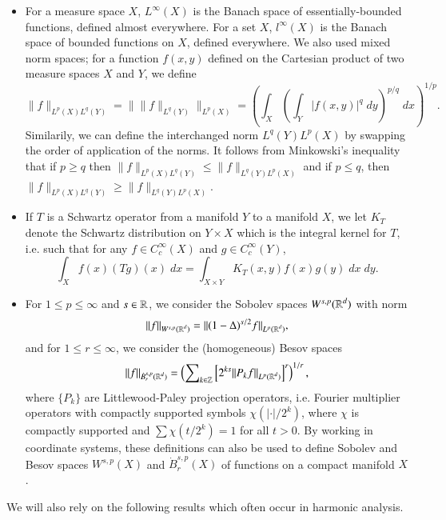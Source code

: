 \begin{itemize}
    \item For a measure space $X$, $L^\infty(X)$ is the Banach space of essentially-bounded functions, defined almost everywhere. For a set $X$, $l^\infty(X)$ is the Banach space of bounded functions on $X$, defined everywhere. We also used mixed norm spaces; for a function $f(x,y)$ defined on the Cartesian product of two measure spaces $X$ and $Y$, we define
    \[ \| f \|_{L^p(X) L^q(Y)} = \big\| \| f \|_{L^q(Y)} \big\|_{L^p(X)} = \left( \int\nolimits_X \left( \int\nolimits_Y |f(x,y)|^q\; dy \right)^{p/q}\; dx \right)^{1/p}. \]
    Similarily, we can define the interchanged norm $L^q(Y) L^p(X)$ by swapping the order of application of the norms. It follows from Minkowski's inequality that if $p \geq q$ then $\| f \|_{L^p(X) L^q(Y)} \leq \| f \|_{L^q(Y) L^p(X)}$ and if $p \leq q$, then $\| f \|_{L^p(X) L^q(Y)} \geq \| f \|_{L^q(Y) L^p(X)}$.

    \item If $T$ is a Schwartz operator from a manifold $Y$ to a manifold $X$, we let $K_T$ denote the Schwartz distribution on $Y \times X$ which is the integral kernel for $T$, i.e. such that for any $f \in C_c^\infty(X)$ and $g \in C_c^\infty(Y)$,
    \[ \int_X f(x) (Tg)(x)\; dx = \int_{X \times Y} K_T(x,y) f(x) g(y)\; dx\; dy. \]


    \item For $1 \leq p \leq \infty$ and $s \in \operatorname{\mathbb{R}}$, we consider the Sobolev spaces $W^{s,p}(\operatorname{\mathbb{R}}^d)$ with norm
    \[ \| f \|_{W^{s,p}(\operatorname{\mathbb{R}}^d)} = \| (1-\Delta)^{s/2} f \|_{L^p(\operatorname{\mathbb{R}}^d)}, \]
    and for $1 \leq r \leq \infty$, we consider the (homogeneous) Besov spaces
    \[ \| f \|_{\dot{B}^{s,p}_r(\operatorname{\mathbb{R}}^d)} = \left( \sum\nolimits_{k \in \operatorname{\mathbb{Z}}} \left[ 2^{ks} \| P_k f \|_{L^p(\operatorname{\mathbb{R}}^d)} \right]^r \right)^{1/r}, \]
    where $\{ P_k \}$ are Littlewood-Paley projection operators, i.e. Fourier multiplier operators with compactly supported symbols $\chi( |\cdot| / 2^k )$, where $\chi$ is compactly supported and $\sum \chi(t/2^k) = 1$ for all $t > 0$. By working in coordinate systems, these definitions can also be used to define Sobolev and Besov spaces $W^{s,p}(X)$ and $\dot{B}^{s,p}_r(X)$ of functions on a compact manifold $X$.
\end{itemize}
%
We will also rely on the following results which often occur in harmonic analysis.

